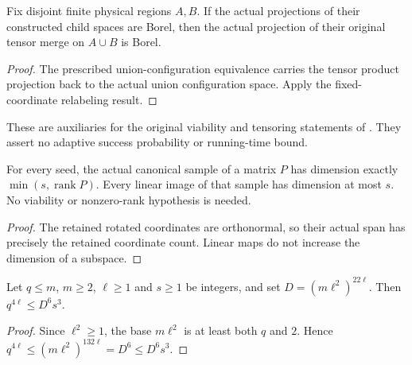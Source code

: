 \begin{lemma}
    \label{lem:borel_actual_regional_tensor_merge}
    \leanok
    Fix disjoint finite physical regions $A,B$. If the actual projections
    of their constructed child spaces are Borel, then the actual
    projection of their original tensor merge on $A\cup B$ is Borel.
\end{lemma}
\begin{proof}\leanok
    The prescribed union-configuration equivalence carries the tensor
    product projection back to the actual union configuration space.
    Apply the fixed-coordinate relabeling result.
\end{proof}

These are auxiliaries for the original viability and tensoring statements
of \cite[lines 433--440 and 500--523]{Arad2016RigorousRG}. They assert no
adaptive success probability or running-time bound.

\begin{lemma}
    \label{lem:canonical_range_sample_dimension}
    \leanok
    For every seed, the actual canonical sample of a matrix $P$ has
    dimension exactly $\min(s,\operatorname{rank}P)$. Every linear image
    of that sample has dimension at most $s$. No viability or nonzero-rank
    hypothesis is needed.
\end{lemma}
\begin{proof}\leanok
    The retained rotated coordinates are orthonormal, so their actual
    span has precisely the retained coordinate count. Linear maps do
    not increase the dimension of a subspace.
\end{proof}

\begin{lemma}
    \label{lem:viable_tree_full_leaf_count}
    \leanok
    Let $q\le m$, $m\ge2$, $\ell\ge1$ and $s\ge1$ be integers, and set
    $D=(m\ell^2)^{22\ell}$. Then $q^{4\ell}\le D^6s^3$.
\end{lemma}
\begin{proof}\leanok
    Since $\ell^2\ge1$, the base $m\ell^2$ is at least both $q$ and $2$.
    Hence $q^{4\ell}\le(m\ell^2)^{132\ell}=D^6\le D^6s^3$.
\end{proof}


